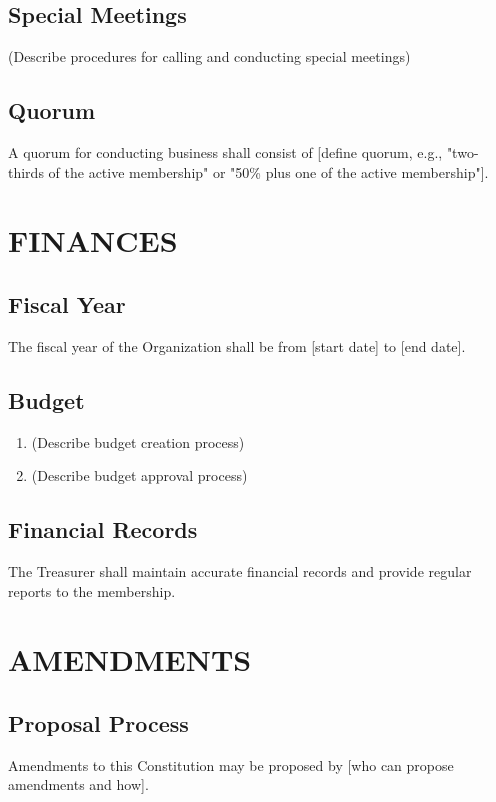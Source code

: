 \documentclass[12pt,letterpaper]{article}
\begin{document}
\subsection{Special Meetings}
(Describe procedures for calling and conducting special meetings)

\subsection{Quorum}
A quorum for conducting business shall consist of [define quorum, e.g., "two-thirds of the active membership" or "50\% plus one of the active membership"].

\section{FINANCES}

\subsection{Fiscal Year}
The fiscal year of the Organization shall be from [start date] to [end date].

\subsection{Budget}
\begin{enumerate}[label=\alph*., leftmargin=2em]
    \item (Describe budget creation process)
    \item (Describe budget approval process)
\end{enumerate}

\subsection{Financial Records}
The Treasurer shall maintain accurate financial records and provide regular reports to the membership.

\section{AMENDMENTS}

\subsection{Proposal Process}
Amendments to this Constitution may be proposed by [who can propose amendments and how].
\end{document}
